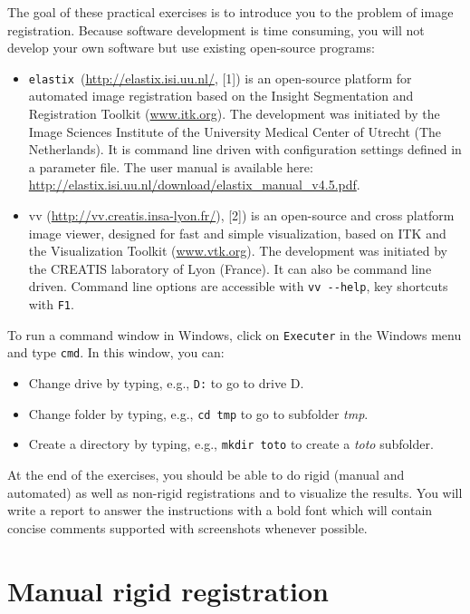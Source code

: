 \documentclass[]{report}
\newcommand{\elastix}{\texttt{elastix}}
\begin{document}
The goal of these practical exercises is to introduce you to the problem of
image registration. Because software development is time consuming, you will
not develop your own software but use existing open-source programs:
\begin{itemize}
\item \elastix\ (\url{http://elastix.isi.uu.nl/}, [1]) is an open-source
    platform for automated image registration based on the Insight
    Segmentation and Registration Toolkit (\url{www.itk.org}). The
    development was initiated by the Image Sciences Institute of the
    University Medical Center of Utrecht (The Netherlands). It is command
    line driven with configuration settings defined in a parameter file.
    The user manual is available here:
    \url{http://elastix.isi.uu.nl/download/elastix_manual_v4.5.pdf}.
\item vv (\url{http://vv.creatis.insa-lyon.fr/}), [2]) is an open-source
    and cross platform image viewer, designed for fast and simple
    visualization, based on ITK and the Visualization Toolkit
    (\url{www.vtk.org}). The development was initiated by the CREATIS
    laboratory of Lyon (France). It can also be command line driven.
    Command line options are accessible with \verb+vv --help+, key
    shortcuts with \verb+F1+.
\end{itemize}

To run a command window in Windows, click on \verb+Executer+ in the Windows
menu and type \verb+cmd+. In this window, you can:
\begin{itemize}
    \item Change drive by typing, e.g., \verb+D:+ to go to drive D.
    \item Change folder by typing, e.g., \verb+cd tmp+ to go to subfolder
\textit{tmp}.
    \item Create a directory by typing, e.g., \verb+mkdir toto+ to create a
\textit{toto} subfolder.
\end{itemize}

At the end of the exercises, you should be able to do rigid (manual and
automated) as well as non-rigid registrations and to visualize the results. You
will write a report to answer the instructions with a bold font which will
contain concise comments supported with screenshots whenever possible.

\section{Manual rigid registration}
\end{document}
